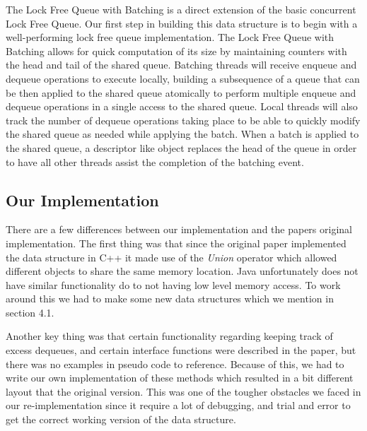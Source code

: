 \setcounter{subsection}{0}
The Lock Free Queue with Batching is a direct extension of the basic concurrent Lock Free Queue. Our first step in building this data structure is to begin with a well-performing lock free queue implementation. The Lock Free Queue with Batching allows for quick computation of its size by maintaining counters with the head and tail of the shared queue. Batching threads will receive enqueue and dequeue operations to execute locally, building a subsequence of a queue that can be then applied to the shared queue atomically to perform multiple enqueue and dequeue operations in a single access to the shared queue. Local threads will also track the number of dequeue operations taking place to be able to quickly modify the shared queue as needed while applying the batch. When a batch is applied to the shared queue, a descriptor like object replaces the head of the queue in order to have all other threads assist the completion of the batching event. 

\subsection{Our Implementation}
 There are a few differences between our implementation and the papers original implementation. The first thing was that since the original paper implemented the data structure in C++ it made use of the \textit{Union} operator which allowed different objects to share the same memory location. Java unfortunately does not have similar functionality do to not having low level memory access. To work around this we had to make some new data structures which we mention in section 4.1.

Another key thing was that certain functionality regarding keeping track of excess dequeues, and certain interface functions were described in the paper, but there was no examples in pseudo code to reference. Because of this, we had to write our own implementation of these methods which resulted in a bit different layout that the original version. This was one of the tougher obstacles we faced in our re-implementation since it require a lot of debugging, and trial and error to get the correct working version of the data structure.  